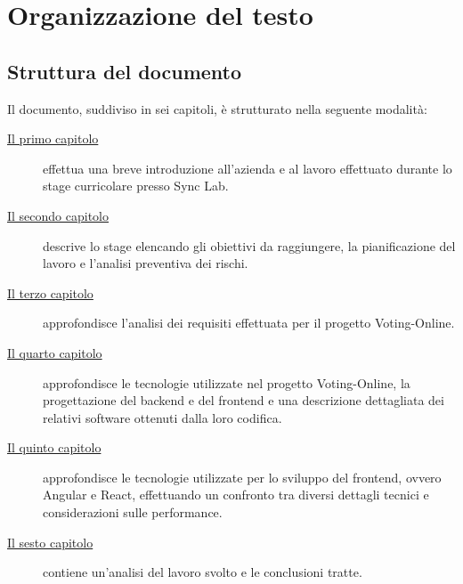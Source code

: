\section{Organizzazione del testo}

\subsection{Struttura del documento}
Il documento, suddiviso in sei capitoli, è strutturato nella seguente modalità:
\begin{description}
    \item[{\hyperref[cap:introduzione]{Il primo capitolo}}] effettua una breve introduzione all'azienda e al lavoro effettuato durante lo stage curricolare presso Sync Lab.

    \item[{\hyperref[cap:descrizione-stage]{Il secondo capitolo}}] descrive lo stage elencando gli obiettivi da raggiungere, la pianificazione del lavoro e l'analisi preventiva dei rischi.
    
    \item[{\hyperref[cap:analisi-requisiti]{Il terzo capitolo}}] approfondisce l'analisi dei requisiti effettuata per il progetto Voting-Online.
    
    \item[{\hyperref[cap:progettazione-codifica]{Il quarto capitolo}}] approfondisce le tecnologie utilizzate nel progetto Voting-Online, la progettazione del \gls{backend} e del \gls{frontend} e una descrizione dettagliata dei relativi software ottenuti dalla loro codifica.
    
    \item[{\hyperref[cap:angular-react]{Il quinto capitolo}}] approfondisce le tecnologie utilizzate per lo sviluppo del \gls{frontend}, ovvero Angular e React, effettuando un confronto tra diversi dettagli tecnici e considerazioni sulle performance.
    
    \item[{\hyperref[cap:conclusioni]{Il sesto capitolo}}] contiene un'analisi del lavoro svolto e le conclusioni tratte.
    
\end{description}

